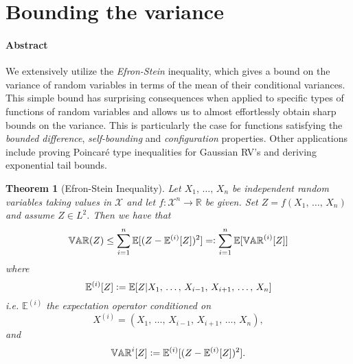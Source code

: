 \documentclass[reqno]{amsproc}
\newtheorem{theorem}{Theorem}
\newcommand{\defeq}{\vcentcolon=} %
\newcommand{\eqdef}{=\vcentcolon} %
\newcommand{\R}{\mathbb{R}}
\newcommand{\E}{\mathbb{E}} %
\newcommand{\var}{\mathbb{VAR}} %
\begin{document}

\section{Bounding the variance}
\label{sec:bound_var}
\paragraph{\textbf{Abstract}}
We extensively utilize the \textit{Efron-Stein} inequality, which gives a bound on the variance of random variables in terms of the mean of their conditional variances. This simple bound has surprising consequences when applied to specific types of functions of random variables and allows us to almost effortlessly obtain sharp bounds on the variance. This is particularly the case for functions satisfying the \textit{bounded difference}, \emph{self-bounding} and \emph{configuration} properties. Other applications include proving Poincar\'{e} type inequalities for Gaussian RV's and deriving exponential tail bounds.

\begin{theorem}[Efron-Stein Inequality]
\label{thm:ESI}
	Let $X_1,\,\dots,\,X_n$ be independent random variables taking values in $\mathcal{X}$ and let $f: \mathcal{X}^n \to \R$ be given.
	Set $Z = f(X_1,\,\dots,\,X_n)$ and assume $Z \in L^2$. Then we have that 
	$$\var(Z)\leq \sum\limits_{i=1}^n \E[(Z-\E^{(i)}[Z])^2] \eqdef \sum\limits_{i=1}^n \E[\var^{(i)}[Z]]$$ where 
	$$\E^{(i)}[Z] \defeq \E[Z|X_1,\,\dots,\,X_{i-1},\,X_{i+1},\,\dots,\,X_n]$$
	i.e. $\E^{(i)}$ the expectation operator conditioned on $$X^{(i)} = (X_1,\,\dots,\,X_{i-1},\,X_{i+1},\,\dots,\,X_n),$$
	and $$\var^{i}[Z] \defeq \E^{(i)}[(Z - \E^{(i)}[Z])^2].$$
\end{theorem}
\end{document}
